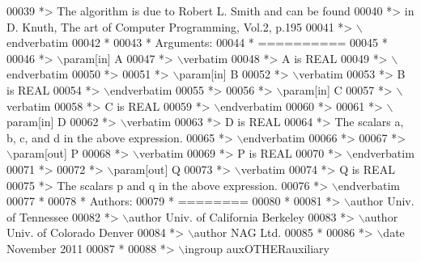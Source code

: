 \begin{DoxyCode}
00039 \textcolor{comment}{*> The algorithm is due to Robert L. Smith and can be found}
00040 \textcolor{comment}{*> in D. Knuth, The art of Computer Programming, Vol.2, p.195}
00041 \textcolor{comment}{*> \(\backslash\)endverbatim}
00042 \textcolor{comment}{*}
00043 \textcolor{comment}{*  Arguments:}
00044 \textcolor{comment}{*  ==========}
00045 \textcolor{comment}{*}
00046 \textcolor{comment}{*> \(\backslash\)param[in] A}
00047 \textcolor{comment}{*> \(\backslash\)verbatim}
00048 \textcolor{comment}{*>          A is REAL}
00049 \textcolor{comment}{*> \(\backslash\)endverbatim}
00050 \textcolor{comment}{*>}
00051 \textcolor{comment}{*> \(\backslash\)param[in] B}
00052 \textcolor{comment}{*> \(\backslash\)verbatim}
00053 \textcolor{comment}{*>          B is REAL}
00054 \textcolor{comment}{*> \(\backslash\)endverbatim}
00055 \textcolor{comment}{*>}
00056 \textcolor{comment}{*> \(\backslash\)param[in] C}
00057 \textcolor{comment}{*> \(\backslash\)verbatim}
00058 \textcolor{comment}{*>          C is REAL}
00059 \textcolor{comment}{*> \(\backslash\)endverbatim}
00060 \textcolor{comment}{*>}
00061 \textcolor{comment}{*> \(\backslash\)param[in] D}
00062 \textcolor{comment}{*> \(\backslash\)verbatim}
00063 \textcolor{comment}{*>          D is REAL}
00064 \textcolor{comment}{*>          The scalars a, b, c, and d in the above expression.}
00065 \textcolor{comment}{*> \(\backslash\)endverbatim}
00066 \textcolor{comment}{*>}
00067 \textcolor{comment}{*> \(\backslash\)param[out] P}
00068 \textcolor{comment}{*> \(\backslash\)verbatim}
00069 \textcolor{comment}{*>          P is REAL}
00070 \textcolor{comment}{*> \(\backslash\)endverbatim}
00071 \textcolor{comment}{*>}
00072 \textcolor{comment}{*> \(\backslash\)param[out] Q}
00073 \textcolor{comment}{*> \(\backslash\)verbatim}
00074 \textcolor{comment}{*>          Q is REAL}
00075 \textcolor{comment}{*>          The scalars p and q in the above expression.}
00076 \textcolor{comment}{*> \(\backslash\)endverbatim}
00077 \textcolor{comment}{*}
00078 \textcolor{comment}{*  Authors:}
00079 \textcolor{comment}{*  ========}
00080 \textcolor{comment}{*}
00081 \textcolor{comment}{*> \(\backslash\)author Univ. of Tennessee }
00082 \textcolor{comment}{*> \(\backslash\)author Univ. of California Berkeley }
00083 \textcolor{comment}{*> \(\backslash\)author Univ. of Colorado Denver }
00084 \textcolor{comment}{*> \(\backslash\)author NAG Ltd. }
00085 \textcolor{comment}{*}
00086 \textcolor{comment}{*> \(\backslash\)date November 2011}
00087 \textcolor{comment}{*}
00088 \textcolor{comment}{*> \(\backslash\)ingroup auxOTHERauxiliary}

\end{DoxyCode}
